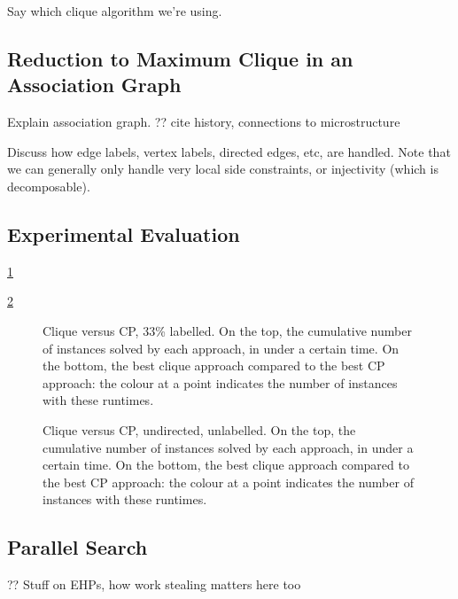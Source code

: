 \documentclass{llncs}
\begin{document}
Say which clique algorithm we're using.

\subsection{Reduction to Maximum Clique in an Association Graph}

Explain association graph. ?? cite history, connections to microstructure

Discuss how edge labels, vertex labels, directed edges, etc, are handled. Note that we can generally
only handle very local side constraints, or injectivity (which is decomposable).

\subsection{Experimental Evaluation}

\cref{figure:unconnected-33}

\cref{figure:unconnected-plain}

\begin{figure}[p]
    \centering
    
    \caption{Clique versus CP, 33\% labelled. On the top, the cumulative
    number of instances solved by each approach, in under a certain time. On the bottom, the best
    clique approach compared to the best CP approach: the colour at a point indicates the number of
    instances with these runtimes.} \label{figure:unconnected-33}
\end{figure}

\begin{figure}[p]
    \centering
    
    \caption{Clique versus CP, undirected, unlabelled. On the top, the cumulative
    number of instances solved by each approach, in under a certain time. On the bottom, the best
    clique approach compared to the best CP approach: the colour at a point indicates the number of
    instances with these runtimes.} \label{figure:unconnected-plain}
\end{figure}

\subsection{Parallel Search}

\cite{DBLP:journals/jcc/KoncDTRJ12,DBLP:journals/algorithms/McCreeshP13,DBLP:journals/topc/McCreeshP15,DBLP:journals/cor/SegundoLP16}

?? Stuff on EHPs, how work stealing matters here too \cite{DBLP:journals/jco/BatsynGMP14}
\end{document}
